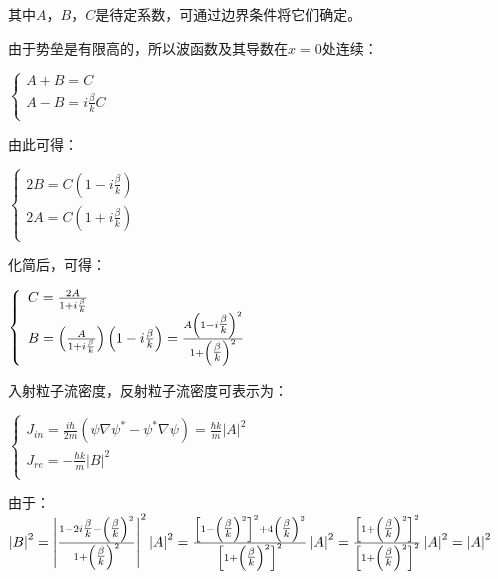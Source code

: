 其中$A$，$B$，$C$是待定系数，可通过边界条件将它们确定。

由于势垒是有限高的，所以波函数及其导数在$x=0$处连续：

\begin{center}
$\left\{ \begin{array}{l}
 A + B = C \\
 A - B = i\frac{\beta }{k}C \\
 \end{array} \right.$
\end{center}

由此可得：

\begin{center}
$\left\{ \begin{array}{l}
 2B = C\left( {1 - i\frac{\beta }{k}} \right) \\
 2A = C\left( {1 + i\frac{\beta }{k}} \right) \\
 \end{array} \right.$
\end{center}

化简后，可得：

\begin{center}
$\left\{ \begin{array}{l}
 C = \frac{{2A}}{{1 + i\frac{\beta }{k}}} \\
 B = \left( {\frac{A}{{1 + i\frac{\beta }{k}}}} \right)\left( {1 - i\frac{\beta }{k}} \right) = \frac{{A\left( {1 - i{\textstyle{\beta  \over k}}} \right)^2 }}{{1 + \left( {{\textstyle{\beta  \over k}}} \right)^2 }} \\
 \end{array} \right.$
\end{center}

入射粒子流密度，反射粒子流密度可表示为：

\begin{center}
$\left\{ \begin{array}{l}
 J_{in}  = \frac{{i\hbar }}{{2m}}\left( {\psi \nabla \psi ^*  - \psi ^* \nabla \psi } \right) = \frac{{\hbar k}}{m}\left| A \right|^2  \\
 J_{re}  =  - \frac{{\hbar k}}{m}\left| B \right|^2  \\
 \end{array} \right.$
\end{center}

由于：$\left| B \right|^2  = \left| {\frac{{1 - 2i{\textstyle{\beta  \over k}} - \left( {{\textstyle{\beta  \over k}}} \right)^2 }}{{1 + \left( {{\textstyle{\beta  \over k}}} \right)^2 }}} \right|^2 \left| A \right|^2  = \frac{{\left[ {1 - \left( {{\textstyle{\beta  \over k}}} \right)^2 } \right]^2  + 4\left( {{\textstyle{\beta  \over k}}} \right)^2 }}{{\left[ {1 + \left( {{\textstyle{\beta  \over k}}} \right)^2 } \right]^2 }}\left| A \right|^2  = \frac{{\left[ {1 + \left( {{\textstyle{\beta  \over k}}} \right)^2 } \right]^2 }}{{\left[ {1 + \left( {{\textstyle{\beta  \over k}}} \right)^2 } \right]^2 }}\left| A \right|^2  = \left| A \right|^2 $

